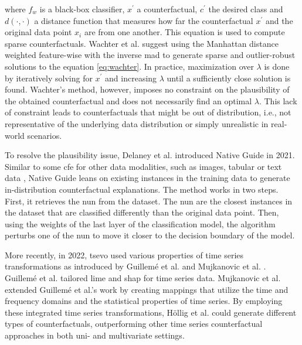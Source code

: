 where $f_{w}$ is a black-box classifier, $x^{\prime}$ a counterfactual, $c^{\prime}$ the desired class and $d(\cdot, \cdot)$ a distance function that measures how far the counterfactual $x^{\prime}$ and the original data point $x_{i}$ are from one another. This equation is used to compute sparse counterfactuals. Wachter et al. \cite{wachter_counterfactual_2018} suggest using the Manhattan distance weighted feature-wise with the inverse \gls{mad} to generate sparse and outlier-robust solutions to the equation \ref{eq:wachter}.
In practice, maximization over $\lambda$ is done by iteratively solving for $x^{\prime}$ and increasing $\lambda$ until a sufficiently close solution is found. Wachter's method, however, imposes no constraint on the plausibility of the obtained counterfactual and does not necessarily find an optimal $\lambda$. This lack of constraint leads to counterfactuals that might be out of distribution, i.e., not representative of the underlying data distribution or simply unrealistic in real-world scenarios.

To resolve the plausibility issue, Delaney et al. \cite{delaney_instance-based_2021} introduced Native Guide in 2021. Similar to some \gls{cfe} for other data modalities, such as images, tabular or text data \cite{keane_good_2020, kenny_twin-systems_2019, hollig_tsevo_2022, nugent_gaining_2009, leake_introduction_2005}, Native Guide leans on existing instances in the training data to generate in-distribution counterfactual explanations. The method works in two steps. First, it retrieves the \gls{nun} from the dataset. The \gls{nun} are the closest instances in the dataset that are classified differently than the original data point.
Then, using the weights of the last layer of the classification model, the algorithm perturbs one of the \gls{nun} to move it closer to the decision boundary of the model.

 More recently, in 2022, \gls{tsevo} \cite{hollig_tsevo_2022} used various properties of time series transformations as introduced by Guillemé et al. \cite{guilleme_agnostic_2019} and Mujkanovic et al. \cite{mujkanovic_timexplain_2023}. Guillemé et al. \cite{guilleme_agnostic_2019} tailored \gls{lime} \cite{ribeiro_why_2016} and \gls{shap} \cite{lundberg_unified_2017} for time series data. Mujkanovic et al. \cite{mujkanovic_timexplain_2023} extended Guillemé et al.'s work by creating mappings that utilize the time and frequency domains and the statistical properties of time series. By employing these integrated time series transformations, Höllig et al. \cite{hollig_tsevo_2022} could generate different types of counterfactuals, outperforming other time series counterfactual approaches in both uni- and multivariate settings.
